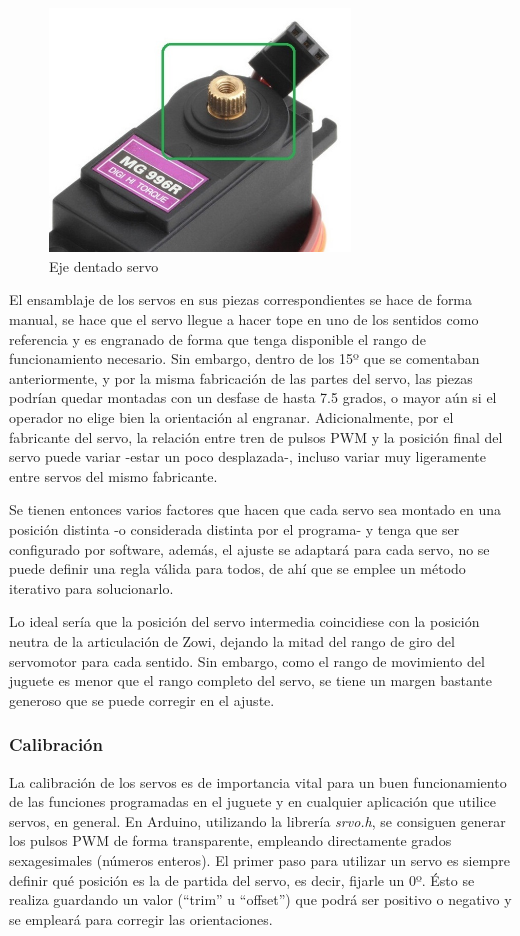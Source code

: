\begin{figure}
\centering
\includegraphics[width=80mm]{Figures/servo-shft.jpg}
\caption[Eje dentado servo]{Eje dentado servo}
\label{fig:EjeServo}
\end{figure}

El ensamblaje de los servos en sus piezas correspondientes se hace de forma manual, se hace que el servo llegue a hacer tope en uno de los sentidos como referencia y es engranado de forma que tenga disponible el rango de funcionamiento necesario. Sin embargo, dentro de los 15º que se comentaban anteriormente, y por la misma fabricación de las partes del servo, las piezas podrían quedar montadas con un desfase de hasta 7.5 grados, o mayor aún si el operador no elige bien la orientación al engranar. Adicionalmente, por el fabricante del servo, la relación entre tren de pulsos PWM y la posición final del servo puede variar -estar un poco desplazada-, incluso variar muy ligeramente entre servos del mismo fabricante.

Se tienen entonces varios factores que hacen que cada servo sea montado en una posición distinta -o considerada distinta por el programa- y tenga que ser configurado por software, además, el ajuste se adaptará para cada servo, no se puede definir una regla válida para todos, de ahí que se emplee un método iterativo para solucionarlo.

Lo ideal sería que la posición del servo intermedia coincidiese con la posición neutra de la articulación de Zowi, dejando la mitad del rango de giro del servomotor para cada sentido. Sin embargo, como el rango de movimiento del juguete es menor que el rango completo del servo, se tiene un margen bastante generoso que se puede corregir en el ajuste.

\subsubsection{Calibración}
La calibración de los servos es de importancia vital para un buen funcionamiento de las funciones programadas en el juguete y en cualquier aplicación que utilice servos, en general. En Arduino, utilizando la librería \textit{srvo.h}, se consiguen generar los pulsos PWM de forma transparente, empleando directamente grados sexagesimales (números enteros). El primer paso para utilizar un servo es siempre definir qué posición es la de partida del servo, es decir, fijarle un 0º. Ésto se realiza guardando un valor (``trim'' u ``offset'') que podrá ser positivo o negativo y se empleará para corregir las orientaciones.

